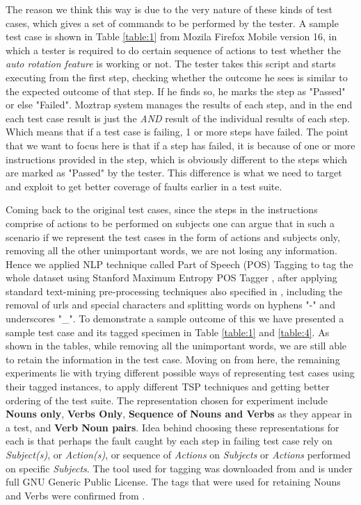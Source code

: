 \documentclass[conference]{IEEEtran}
\begin{document}
The reason we think this way is due to the very nature of these kinds of test cases, which gives a set of commands to be performed by the tester. A sample test case is shown in Table \ref{table:1} from Mozila Firefox Mobile version 16, in which a tester is required to do certain sequence of actions to test whether the \textit{auto rotation feature} is working or not. The tester takes this script and starts executing from the first step, checking whether the outcome he sees is similar to the expected outcome of that step. If he finds so, he marks the step as "Passed" or else "Failed". Moztrap system manages the results of each step, and in the end each test case result is just the \textit{AND} result of the individual results of each step. Which means that if a test case is failing, 1 or more steps have failed. The point that we want to focus here is that if a step has failed, it is because of one or more instructions provided in the step, which is obviously different to the steps which are marked as "Passed" by the tester. This difference is what we need to target and exploit to get better coverage of faults earlier in a test suite.
\par
Coming back to the original test cases, since the steps in the instructions comprise of actions to be performed on subjects one can argue that in such a scenario if we represent the test cases in the form of actions and subjects only, removing all the other unimportant words, we are not losing any information. Hence we applied NLP technique called Part of Speech (POS) Tagging to tag the whole dataset using Stanford Maximum Entropy POS Tagger \cite{tout2003POS}, after applying standard text-mining pre-processing techniques also specified in \cite{hemmati2015prioritization}, including the removal of urls and special characters and splitting words on hyphens "-" and underscores "\_". To demonstrate a sample outcome of this we have presented a sample test case and its tagged specimen in Table \ref{table:1} and \ref{table:4}. As shown in the tables, while removing all the unimportant words, we are still able to retain the information in the test case. Moving on from here, the remaining experiments lie with trying different possible ways of representing test cases using their tagged instances, to apply different TSP techniques and getting better ordering of the test suite. The representation chosen for experiment include \textbf{Nouns only}, \textbf{Verbs Only}, \textbf{Sequence of Nouns and Verbs} as they appear in a test, and \textbf{Verb Noun pairs}. Idea behind choosing these representations for each is that perhaps the fault caught by each step in failing test case rely on \textit{Subject(s)}, or \textit{Action(s)}, or sequence of \textit{Actions} on \textit{Subjects} or \textit{Actions} performed on specific \textit{Subjects}. The tool used for tagging was downloaded from \cite{loglinearweb} and is under full GNU Generic Public License. The tags that were used for retaining Nouns and Verbs were confirmed from \cite{sant1990POS}. \par
\end{document}
